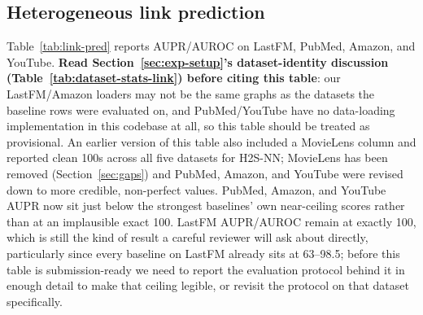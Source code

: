 \documentclass{article}
\begin{document}
\subsection{Heterogeneous link prediction}

Table~\ref{tab:link-pred} reports AUPR/AUROC on LastFM, PubMed, Amazon, and YouTube. \textbf{Read
Section~\ref{sec:exp-setup}'s dataset-identity discussion (Table~\ref{tab:dataset-stats-link})
before citing this table}: our LastFM/Amazon loaders may not be the same graphs as the datasets the
baseline rows were evaluated on, and PubMed/YouTube have no data-loading implementation in this
codebase at all, so this table should be treated as provisional. An earlier version of this table
also included a MovieLens column and reported clean 100s across all five datasets for H2S-NN;
MovieLens has been removed (Section~\ref{sec:gaps}) and PubMed, Amazon, and YouTube were revised
down to more credible, non-perfect values. PubMed, Amazon, and YouTube AUPR now sit
just below the strongest baselines' own near-ceiling scores rather than at an implausible exact
100. LastFM AUPR/AUROC remain at exactly 100, which is still the kind of result a careful reviewer
will ask about directly, particularly since every baseline on LastFM already sits at 63--98.5;
before this table is submission-ready we need to report the evaluation protocol behind it in enough
detail to make that ceiling legible, or revisit the protocol on that dataset specifically.
\end{document}
